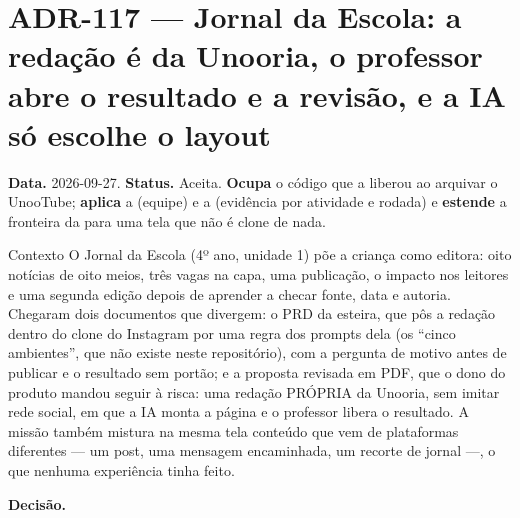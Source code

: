 \section{ADR-117 --- Jornal da Escola: a redação é da Unooria, o professor abre o resultado e a revisão, e a IA só escolhe o layout}
\label{adr:jornal-da-escola}

\textbf{Data.} 2026-09-27. \textbf{Status.} Aceita.
\textbf{Ocupa} o código  que a  liberou ao arquivar o
UnooTube; \textbf{aplica} a  (equipe) e a 
(evidência por atividade e rodada) e \textbf{estende} a fronteira da
 para uma tela que não é clone de nada.

\begin{especificacao}{Contexto}
O Jornal da Escola (4º ano, unidade 1) põe a criança como editora: oito notícias
de oito meios, três vagas na capa, uma publicação, o impacto nos leitores e uma
segunda edição depois de aprender a checar fonte, data e autoria. Chegaram dois
documentos que divergem: o PRD da esteira, que pôs a redação dentro do clone do
Instagram por uma regra dos prompts dela (os \enquote{cinco ambientes}, que não
existe neste repositório), com a pergunta de motivo antes de publicar e o
resultado sem portão; e a proposta revisada em PDF, que o dono do produto mandou
seguir à risca: uma redação PRÓPRIA da Unooria, sem imitar rede social, em que a
IA monta a página e o professor libera o resultado. A missão também mistura na
mesma tela conteúdo que vem de plataformas diferentes --- um post, uma mensagem
encaminhada, um recorte de jornal ---, o que nenhuma experiência tinha feito.
\end{especificacao}

\textbf{Decisão.}

